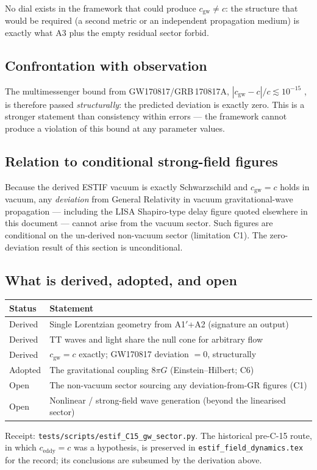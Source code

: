 \begin{center}
\end{center}

\noindent
No dial exists in the framework that could produce $c_\text{gw} \neq c$: the
structure that would be required (a second metric or an independent propagation
medium) is exactly what A3 plus the empty residual sector forbid.

\subsection{Confrontation with observation}

The multimessenger bound from GW170817/GRB\,170817A,
$|c_\text{gw} - c|/c \lesssim 10^{-15}$ \cite{LIGO2017GW170817}, is therefore
passed \emph{structurally}: the predicted deviation is exactly zero. This is a
stronger statement than consistency within errors --- the framework cannot
produce a violation of this bound at any parameter values.

\subsection{Relation to conditional strong-field figures}

Because the derived ESTIF vacuum is exactly Schwarzschild and $c_\text{gw} = c$
holds in vacuum, any \emph{deviation} from General Relativity in vacuum
gravitational-wave propagation --- including the LISA Shapiro-type delay figure
quoted elsewhere in this document --- cannot arise from the vacuum sector. Such
figures are conditional on the un-derived non-vacuum sector (limitation C1). The
zero-deviation result of this section is unconditional.

\subsection{What is derived, adopted, and open}

\begin{center}
\begin{tabular}{ll}
\toprule
Status & Statement \\
\midrule
Derived & Single Lorentzian geometry from A1$'$+A2 (signature an output) \\
Derived & TT waves and light share the null cone for arbitrary flow \\
Derived & $c_\text{gw} = c$ exactly; GW170817 deviation $= 0$, structurally \\
\midrule
Adopted & The gravitational coupling $8\pi G$ (Einstein--Hilbert; C6) \\
\midrule
Open & The non-vacuum sector sourcing any deviation-from-GR figures (C1) \\
Open & Nonlinear / strong-field wave generation (beyond the linearised sector) \\
\bottomrule
\end{tabular}
\end{center}

\noindent
Receipt: \texttt{tests/scripts/estif\_C15\_gw\_sector.py}. The historical
pre-C-15 route, in which $c_\text{eddy} = c$ was a hypothesis, is preserved in
\texttt{estif\_field\_dynamics.tex} for the record; its conclusions are
subsumed by the derivation above.
